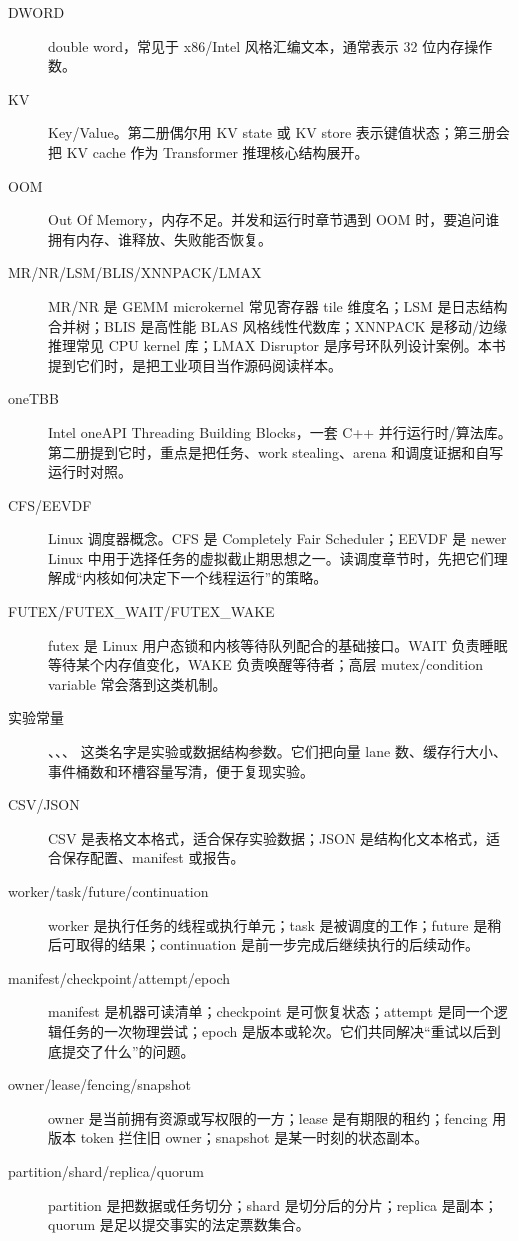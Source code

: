 \begin{description}
  \item[DWORD] double word，常见于 x86/Intel 风格汇编文本，通常表示 32 位内存操作数。
  \item[KV] Key/Value。第二册偶尔用 KV state 或 KV store 表示键值状态；第三册会把 KV cache 作为 Transformer 推理核心结构展开。
  \item[OOM] Out Of Memory，内存不足。并发和运行时章节遇到 OOM 时，要追问谁拥有内存、谁释放、失败能否恢复。
  \item[MR/NR/LSM/BLIS/XNNPACK/LMAX] MR/NR 是 GEMM microkernel 常见寄存器 tile 维度名；LSM 是日志结构合并树；BLIS 是高性能 BLAS 风格线性代数库；XNNPACK 是移动/边缘推理常见 CPU kernel 库；LMAX Disruptor 是序号环队列设计案例。本书提到它们时，是把工业项目当作源码阅读样本。
  \item[oneTBB] Intel oneAPI Threading Building Blocks，一套 C++ 并行运行时/算法库。第二册提到它时，重点是把任务、work stealing、arena 和调度证据和自写运行时对照。
  \item[CFS/EEVDF] Linux 调度器概念。CFS 是 Completely Fair Scheduler；EEVDF 是 newer Linux 中用于选择任务的虚拟截止期思想之一。读调度章节时，先把它们理解成“内核如何决定下一个线程运行”的策略。
  \item[FUTEX/FUTEX\_WAIT/FUTEX\_WAKE] futex 是 Linux 用户态锁和内核等待队列配合的基础接口。WAIT 负责睡眠等待某个内存值变化，WAKE 负责唤醒等待者；高层 mutex/condition variable 常会落到这类机制。
  \item[实验常量] 、、、 这类名字是实验或数据结构参数。它们把向量 lane 数、缓存行大小、事件桶数和环槽容量写清，便于复现实验。
  \item[CSV/JSON] CSV 是表格文本格式，适合保存实验数据；JSON 是结构化文本格式，适合保存配置、manifest 或报告。
  \item[worker/task/future/continuation] worker 是执行任务的线程或执行单元；task 是被调度的工作；future 是稍后可取得的结果；continuation 是前一步完成后继续执行的后续动作。
  \item[manifest/checkpoint/attempt/epoch] manifest 是机器可读清单；checkpoint 是可恢复状态；attempt 是同一个逻辑任务的一次物理尝试；epoch 是版本或轮次。它们共同解决“重试以后到底提交了什么”的问题。
  \item[owner/lease/fencing/snapshot] owner 是当前拥有资源或写权限的一方；lease 是有期限的租约；fencing 用版本 token 拦住旧 owner；snapshot 是某一时刻的状态副本。
  \item[partition/shard/replica/quorum] partition 是把数据或任务切分；shard 是切分后的分片；replica 是副本；quorum 是足以提交事实的法定票数集合。

\end{description}
